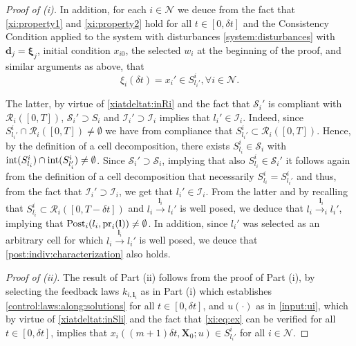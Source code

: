 \documentclass[reqno]{amsart}
\theoremstyle{plain}
\theoremstyle{definition}
\numberwithin{equation}{section}
\begin{document}
\begin{proof}[Proof of (i)]
\noindent In addition, for each $i\in{\ensuremath{\mathcal{N}}}$ we deuce from the fact that \eqref{xi:property1} and \eqref{xi:property2} hold for all $t\in[0,\delta t]$ and the Consistency Condition applied to the system with disturbances \eqref{system:disturbances} with ${\textbf{{d}}}_j={\ensuremath{\boldsymbol{{\xi}}}}_j$, initial condition $x_{i0}$, the selected $w_i$ at the beginning of the proof, and similar arguments as above, that 
\begin{equation}\label{xiatdeltat:inSli}
\xi_i(\delta t)=x_i'\in S_{l_i'}^i,\forall i\in{\ensuremath{\mathcal{N}}}.
\end{equation}

\noindent The latter, by virtue of \eqref{xiatdeltat:inRi} and the fact that ${\ensuremath{\mathcal{S}}}_i'$ is compliant with ${\ensuremath{\mathcal{R}}}_i([0,T])$, ${\ensuremath{\mathcal{S}}}_i'\supset S_i$ and ${\ensuremath{\mathcal{I}}}_i'\supset {\ensuremath{\mathcal{I}}}_i$ implies that $l_i'\in {\ensuremath{\mathcal{I}}}_i$. Indeed, since $ S_{l_i'}^i\cap{\ensuremath{\mathcal{R}}}_i([0,T])\ne\emptyset$ we have from compliance that $S_{l_i'}^i\subset{\ensuremath{\mathcal{R}}}_i([0,T])$. Hence, by the definition of a cell decomposition, there exists $S_{l_i}^i\in{\ensuremath{\mathcal{S}}}_i$ with ${\rm int}(S_{l_i}^i)\cap{\rm int}(S_{l_i'}^i)\ne\emptyset$. Since ${\ensuremath{\mathcal{S}}}_i'\supset {\ensuremath{\mathcal{S}}}_i$, implying that also $S_{l_i}^i\in{\ensuremath{\mathcal{S}}}_i'$ it follows again from the definition of a cell decomposition that necessarily $S_{l_i}^i=S_{l_i'}^i$ and thus, from the fact that ${\ensuremath{\mathcal{I}}}_i'\supset {\ensuremath{\mathcal{I}}}_i$, we get that $l_i'\in {\ensuremath{\mathcal{I}}}_i$. From the latter and by recalling that $S_{l_i}^i\subset{\ensuremath{\mathcal{R}}}_i([0,T-\delta t])$ and  $l_i\overset{{\textbf{{l}}}_i}{\longrightarrow}l_i'$ is well posed, we deduce that $l_i\overset{{\textbf{{l}}}_i}{\longrightarrow_i}l_i'$, implying that ${\rm Post}_i(l_i,{\rm pr}_i({\textbf{{l}}}))\ne\emptyset$. In addition, since $l_i'$ was selected as an arbitrary cell for which $l_i\overset{{\textbf{{l}}}_i}{\longrightarrow}l_i'$ is well posed, we deuce that \eqref{post:indiv:characterization} also holds.

\noindent \textit{Proof of (ii).} The result of Part (ii) follows from the proof of Part (i), by selecting the feedback laws $k_{i,{\textbf{{l}}}_i}$ as in Part (i) which establishes \eqref{control:laws:along:solutions} for all $t\in[0,\delta t]$, and $u(\cdot)$ as in \eqref{input:ui}, which by virtue of \eqref{xiatdeltat:inSli} and the fact that \eqref{xi:eq:ex} can be verified for all $t\in[0,\delta t]$, implies that $x_i((m+1)\delta t,{\textbf{{X}}}_0;u)\in S_{l_i'}^i$ for all $i\in{\ensuremath{\mathcal{N}}}$.
\end{proof}
\end{document}
